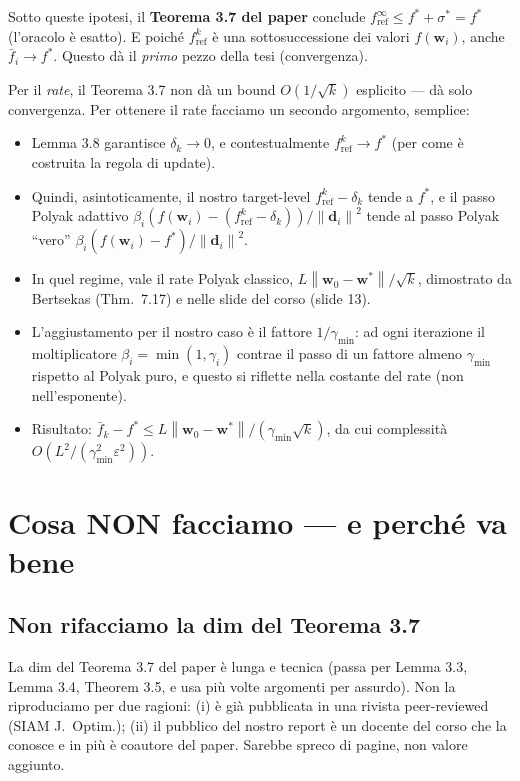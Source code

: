 \documentclass[11pt,a4paper]{article}
\newcommand{\norm}[1]{\left\|#1\right\|}
\newcommand{\bw}{\mathbf{w}}
\newcommand{\bd}{\mathbf{d}}
\theoremstyle{definition}
\begin{document}
Sotto queste ipotesi, il \textbf{Teorema 3.7 del paper} conclude $f^\infty_{\mathrm{ref}} \le f^* + \sigma^* = f^*$ (l'oracolo è esatto). E poiché $f^k_{\mathrm{ref}}$ è una sottosuccessione dei valori $f(\bw_i)$, anche $\bar f_i \to f^*$. Questo dà il \emph{primo} pezzo della tesi (convergenza).

Per il \emph{rate}, il Teorema 3.7 non dà un bound $O(1/\sqrt k)$ esplicito --- dà solo convergenza. Per ottenere il rate facciamo un secondo argomento, semplice:

\begin{itemize}[leftmargin=*]
\item Lemma 3.8 garantisce $\delta_k \to 0$, e contestualmente $f^k_{\mathrm{ref}} \to f^*$ (per come è costruita la regola di update).
\item Quindi, asintoticamente, il nostro target-level $f^k_{\mathrm{ref}} - \delta_k$ tende a $f^*$, e il passo Polyak adattivo $\beta_i (f(\bw_i) - (f^k_{\mathrm{ref}}-\delta_k))/\norm{\bd_i}^2$ tende al passo Polyak ``vero'' $\beta_i (f(\bw_i) - f^*)/\norm{\bd_i}^2$.
\item In quel regime, vale il rate Polyak classico, $L\norm{\bw_0-\bw^*}/\sqrt k$, dimostrato da Bertsekas (Thm.\ 7.17) e nelle slide del corso (slide 13).
\item L'aggiustamento per il nostro caso è il fattore $1/\gamma_{\min}$: ad ogni iterazione il moltiplicatore $\beta_i = \min(1,\gamma_i)$ contrae il passo di un fattore almeno $\gamma_{\min}$ rispetto al Polyak puro, e questo si riflette nella costante del rate (non nell'esponente).
\item Risultato: $\bar f_k - f^* \le L\norm{\bw_0-\bw^*}/(\gamma_{\min}\sqrt k)$, da cui complessità $O(L^2/(\gamma_{\min}^2 \varepsilon^2))$.
\end{itemize}

\section{Cosa NON facciamo --- e perché va bene}

\subsection*{Non rifacciamo la dim del Teorema 3.7}

La dim del Teorema 3.7 del paper è lunga e tecnica (passa per Lemma 3.3, Lemma 3.4, Theorem 3.5, e usa più volte argomenti per assurdo). Non la riproduciamo per due ragioni: (i) è già pubblicata in una rivista peer-reviewed (SIAM J.\ Optim.); (ii) il pubblico del nostro report è un docente del corso che la conosce e in più è coautore del paper. Sarebbe spreco di pagine, non valore aggiunto.
\end{document}

